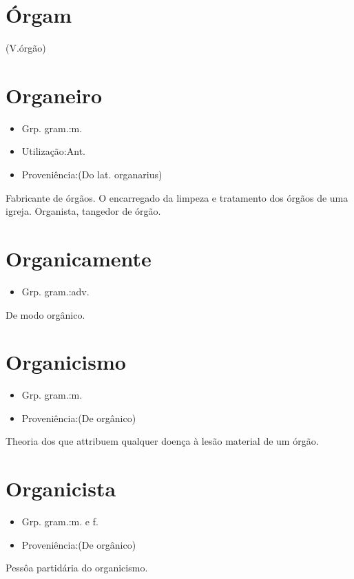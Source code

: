 \section{Órgam}
(V.órgão)
\section{Organeiro}
\begin{itemize}
\item {Grp. gram.:m.}
\end{itemize}
\begin{itemize}
\item {Utilização:Ant.}
\end{itemize}
\begin{itemize}
\item {Proveniência:(Do lat. \textunderscore organarius\textunderscore )}
\end{itemize}
Fabricante de órgãos.
O encarregado da limpeza e tratamento dos órgãos de uma igreja.
Organista, tangedor de órgão.
\section{Organicamente}
\begin{itemize}
\item {Grp. gram.:adv.}
\end{itemize}
De modo orgânico.
\section{Organicismo}
\begin{itemize}
\item {Grp. gram.:m.}
\end{itemize}
\begin{itemize}
\item {Proveniência:(De \textunderscore orgânico\textunderscore )}
\end{itemize}
Theoria dos que attribuem qualquer doença à lesão material de um órgão.
\section{Organicista}
\begin{itemize}
\item {Grp. gram.:m.  e  f.}
\end{itemize}
\begin{itemize}
\item {Proveniência:(De \textunderscore orgânico\textunderscore )}
\end{itemize}
Pessôa partidária do organicismo.
